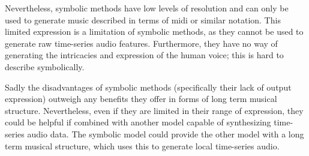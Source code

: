 Nevertheless, symbolic methods have low levels of resolution and can only be used to generate music described in terms of midi or similar notation. This limited expression is a limitation of symbolic methods, as they cannot be used to generate raw time-series audio features. Furthermore, they have no way of generating the intricacies and expression of the human voice; this is hard to describe symbolically. 

Sadly the disadvantages of symbolic methods (specifically their lack of output expression) outweigh any benefits they offer in forms of long term musical structure. Nevertheless, even if they are limited in their range of expression, they could be helpful if combined with another model capable of synthesizing time-series audio data. The symbolic model could provide the other model with a long term musical structure, which uses this to generate local time-series audio.